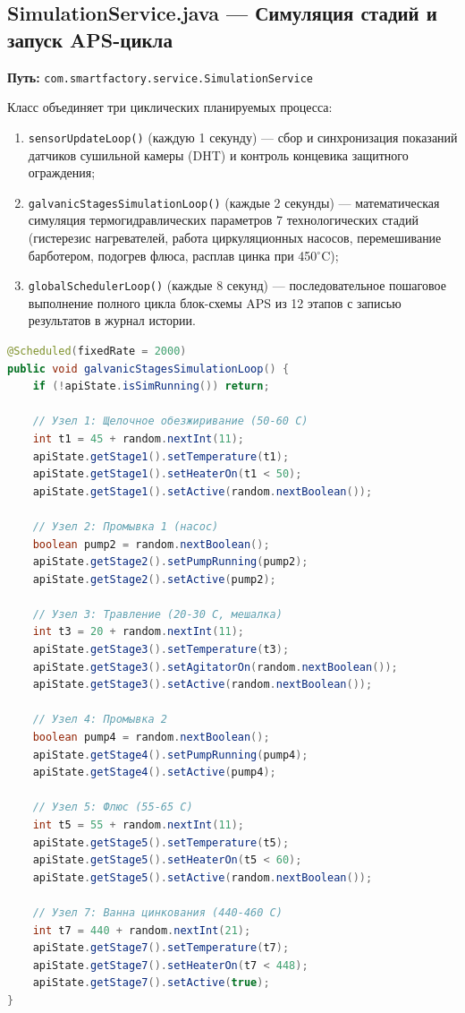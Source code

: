 \documentclass[14pt, a4paper]{extarticle}
\begin{document}
\subsection{SimulationService.java --- Симуляция стадий и запуск APS-цикла}

\textbf{Путь:} \texttt{com.smartfactory.service.SimulationService}

Класс объединяет три циклических планируемых процесса:
\begin{enumerate}
    \item \texttt{sensorUpdateLoop()} (каждую 1 секунду) --- сбор и синхронизация показаний датчиков сушильной камеры (DHT) и контроль концевика защитного ограждения;
    \item \texttt{galvanicStagesSimulationLoop()} (каждые 2 секунды) --- математическая симуляция термогидравлических параметров 7 технологических стадий (гистерезис нагревателей, работа циркуляционных насосов, перемешивание барботером, подогрев флюса, расплав цинка при 450$^\circ$C);
    \item \texttt{globalSchedulerLoop()} (каждые 8 секунд) --- последовательное пошаговое выполнение полного цикла блок-схемы APS из 12 этапов с записью результатов в журнал истории.
\end{enumerate}

\begin{lstlisting}[language=Java, caption=Фрагмент SimulationService.java с симуляцией стадий цинкования]
@Scheduled(fixedRate = 2000)
public void galvanicStagesSimulationLoop() {
    if (!apiState.isSimRunning()) return;

    // Узел 1: Щелочное обезжиривание (50-60 C)
    int t1 = 45 + random.nextInt(11);
    apiState.getStage1().setTemperature(t1);
    apiState.getStage1().setHeaterOn(t1 < 50);
    apiState.getStage1().setActive(random.nextBoolean());

    // Узел 2: Промывка 1 (насос)
    boolean pump2 = random.nextBoolean();
    apiState.getStage2().setPumpRunning(pump2);
    apiState.getStage2().setActive(pump2);

    // Узел 3: Травление (20-30 C, мешалка)
    int t3 = 20 + random.nextInt(11);
    apiState.getStage3().setTemperature(t3);
    apiState.getStage3().setAgitatorOn(random.nextBoolean());
    apiState.getStage3().setActive(random.nextBoolean());

    // Узел 4: Промывка 2
    boolean pump4 = random.nextBoolean();
    apiState.getStage4().setPumpRunning(pump4);
    apiState.getStage4().setActive(pump4);

    // Узел 5: Флюс (55-65 C)
    int t5 = 55 + random.nextInt(11);
    apiState.getStage5().setTemperature(t5);
    apiState.getStage5().setHeaterOn(t5 < 60);
    apiState.getStage5().setActive(random.nextBoolean());

    // Узел 7: Ванна цинкования (440-460 C)
    int t7 = 440 + random.nextInt(21);
    apiState.getStage7().setTemperature(t7);
    apiState.getStage7().setHeaterOn(t7 < 448);
    apiState.getStage7().setActive(true);
}
\end{lstlisting}
\end{document}

